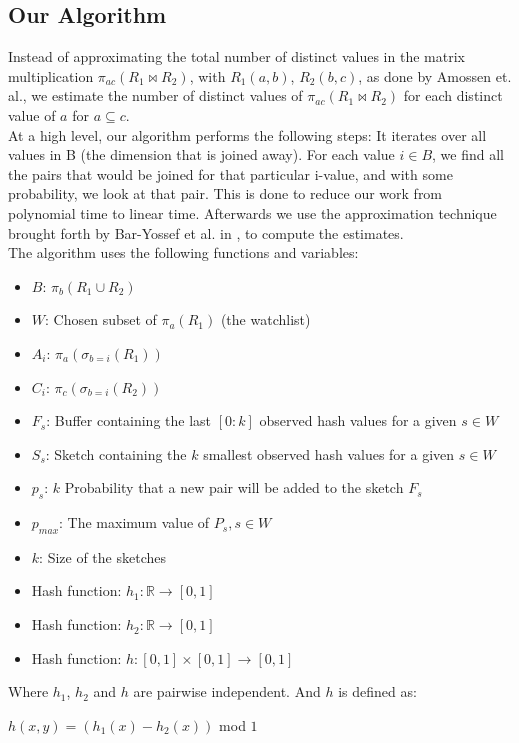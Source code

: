 \documentclass[a4paper,11pt]{article}
\begin{document}
\subsection{Our Algorithm}
\label{subsub:alg}
Instead of approximating the total number of distinct values in the matrix multiplication $\pi_{ac}(R_1 \Join R_2)$, with $R_1(a,b)$, $R_2(b,c)$, as done by Amossen et. al., we estimate the number of distinct values of $\pi_{ac}(R_1 \Join R_2)$ for each distinct value of $a$ for $a \subseteq c$.\\ %
At a high level, our algorithm performs the following steps: It iterates over all values in B (the dimension that is joined away). For each value $i \in B$, we find all the pairs that would be joined for that particular i-value, and with some probability, we look at that pair. This is done to reduce our work from polynomial time to linear time. Afterwards we use the approximation technique brought forth by Bar-Yossef et al. in \cite{paper:bar-yos}, to compute the estimates.\\

The algorithm uses the following functions and variables:

\begin{itemize}
  \item $B$: $\pi_{b}(R_1 \cup R_2)$
  \item $W$: Chosen subset of $\pi_{a}(R_1)$ (the watchlist)
  \item $A_i$: $\pi_{a}(\sigma_{b=i}(R_1))$
  \item $C_i$: $\pi_{c}(\sigma_{b=i}(R_2))$
  \item $F_s$: Buffer containing the last $[0:k]$ observed hash values for a given $s \in W$
  \item $S_s$: Sketch containing the $k$ smallest observed hash values for a given $s \in W$
  \item $p_s$: $k$ Probability that a new pair will be added to the sketch $F_s$
  \item $p_{max}$: The maximum value of $P_s, s \in W$
  \item $k$: Size of the sketches
  \item Hash function: $h_1 : \mathbb{R} \rightarrow [0,1]$
  \item Hash function: $h_2 : \mathbb{R} \rightarrow [0,1]$
  \item Hash function: $h : [0,1] \times [0,1] \rightarrow [0,1]$
\end{itemize} 
Where $h_1$, $h_2$ and $h$ are pairwise independent. And $h$ is defined as:
\begin{center}
$h(x,y) = (h_1(x) - h_2(x))$ mod $1$
\end{center}
\end{document}
